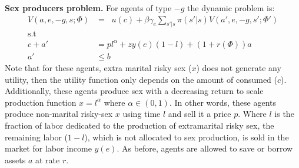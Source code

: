 \noindent \textbf{Sex producers problem.} For agents of type $-g$ the dynamic problem is:
\begin{align}
V(a,e,-g,s;\Phi) &= \mathop{\max_{c\geq 0, 1\geq l\geq 0,a' \geq 0}}  u(c) + \beta \gamma_{e} \sum_{s'|s}\pi(s'|s)V(a',e,-g,s';\Phi') \label{eq3}\\
\mbox{s.t}\nonumber\\
c +a'&= pl^{\alpha}+zy(e)(1-l) + (1+r(\Phi))a \label{eq4}\\
a' &\leq b
\end{align}
Note that for these agents, extra marital risky sex ($x$) does not generate any utility, then the utility function only depends on the amount of consumed ($c$). Additionally, these agents produce sex with a decreasing return to scale production function $x=l^{\alpha}$ where $\alpha\in(0,1)$. In other words, these agents produce non-marital risky-sex $x$ using time $l$ and sell it a price $p$. Where $l$ is the fraction of labor dedicated to the production of extramarital risky sex, the remaining labor ($1-l$), which is not allocated to sex production, is sold in the market for labor income $y(e)$. As before, agents are allowed to save or borrow assets $a$ at rate $r$.\\

